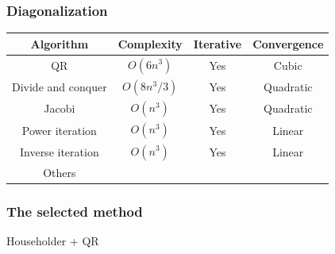 \documentclass[serif, 12pt]{beamer}
\begin{document}

\begin{frame}
%
\frametitle{Diagonalization}
%
\begin{center}
\begin{tabular}{c c c c}
	\toprule
	Algorithm 		& Complexity  & Iterative & Convergence\\
	\midrule
	QR                  & $O(6n^3)$ 	& Yes       & Cubic \\
	Divide and conquer  & $O(8n^3/3)$ & Yes       & Quadratic \\
	Jacobi              & $O(n^3)$    & Yes       & Quadratic \\
	Power iteration			& $O(n^3)$    & Yes       & Linear \\
	Inverse iteration	  & $O(n^3)$    & Yes       & Linear \\
	Others				&             &          \\
	\bottomrule
\end{tabular}
\end{center}
\end{frame}


\begin{frame}
%
\frametitle{The selected method}
%
\centering
Householder + QR
\end{frame}

\end{document}
